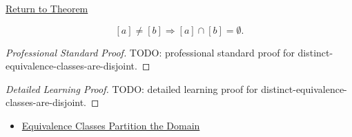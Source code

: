 \newpage
{}
\label{prf:distinct-equivalence-classes-are-disjoint}

\begin{remark*}[Return]
\hyperref[lem:distinct-equivalence-classes-are-disjoint]{Return to Theorem}
\end{remark*}

\begin{lemma*}
\[
[a]\ne[b] \Longrightarrow [a]\cap[b]=\emptyset.
\]
\end{lemma*}

\begin{proof}[Professional Standard Proof]
\LRAProofBodyStart
TODO: professional standard proof for distinct-equivalence-classes-are-disjoint.
\end{proof}

\begin{proof}[Detailed Learning Proof]
\LRAProofBodyStart
TODO: detailed learning proof for distinct-equivalence-classes-are-disjoint.
\end{proof}

\begin{remark*}
\end{remark*}

\begin{dependencies}
\begin{itemize}
  \item \hyperref[thm:equivalence-classes-partition-domain]{Equivalence Classes Partition the Domain}
\end{itemize}
\end{dependencies}

\clearpage
